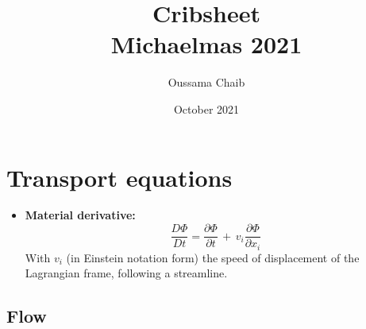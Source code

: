 \documentclass[a4paper,11pt]{article}
\title{%
	Cribsheet \\
	\vspace{10pt}
	\small Michaelmas 2021}
\author{\small Oussama Chaib}
\date{\small October 2021}
\begin{document}
	\maketitle
\section{Transport equations}
\begin{itemize}
	\item \textbf{Material derivative:} \[\frac{D\Phi}{Dt} = \frac{\partial \Phi}{\partial t}\, +\, v_i\frac{\partial \Phi}{\partial x_i}\]
With $v_i$ (in Einstein notation form) the speed of displacement of the Lagrangian frame, following a streamline.
\end{itemize}
\subsection{Flow}
\end{document}
